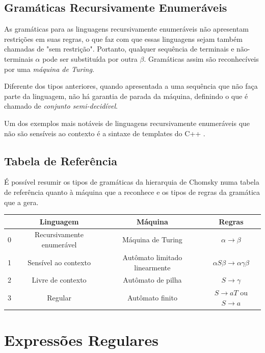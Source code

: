 \documentclass[a4paper,12pt,oneside,onecolumn]{uerj}
\begin{document}
\subsection{Gramáticas Recursivamente Enumeráveis}

As gramáticas para as linguagens recursivamente enumeráveis não apresentam restrições em suas regras, o que faz com que essas linguagens sejam também chamadas de "sem restrição". Portanto, qualquer sequência de terminais e não-terminais $\alpha$ pode ser substituída por outra $\beta$. Gramáticas assim são reconhecíveis por uma \emph{máquina de Turing}. 

Diferente dos tipos anteriores, quando apresentada a uma sequência que não faça parte da linguagem, não há garantia de parada da máquina, definindo o que é chamado de \emph{conjunto semi-decidível}.

Um dos exemplos mais notáveis de linguagens recursivamente enumeráveis que não são sensíveis ao contexto é a sintaxe de templates do C++ \cite{bib:Veldhuizen03}.

\subsection{Tabela de Referência}

É possível resumir os tipos de gramáticas da hierarquia de Chomsky numa tabela de referência quanto à máquina que a reconhece e os tipos de regras da gramática que a gera.

\begin{center}
	\begin{tabular}{ c | c | c | c }
		 & {\bf Linguagem} & {\bf Máquina} & {\bf Regras} \\
		\hline 
		0 & Recursivamente enumerável & Máquina de Turing 			 & 
			$\alpha \rightarrow \beta$ \\ 
		1 & Sensível ao contexto 		& Autômato limitado linearmente & 
			$\alpha S\beta\rightarrow \alpha\gamma\beta$\\ 
		2 & Livre de contexto 			& Autômato de pilha 			 & 
			$S \rightarrow \gamma$\\ 
		3 & Regular 					& Autômato finito 				 &
			$S \rightarrow aT$ ou $S \rightarrow a$\\ 
	\end{tabular}
\end{center}

\section{Expressões Regulares}
\end{document}
